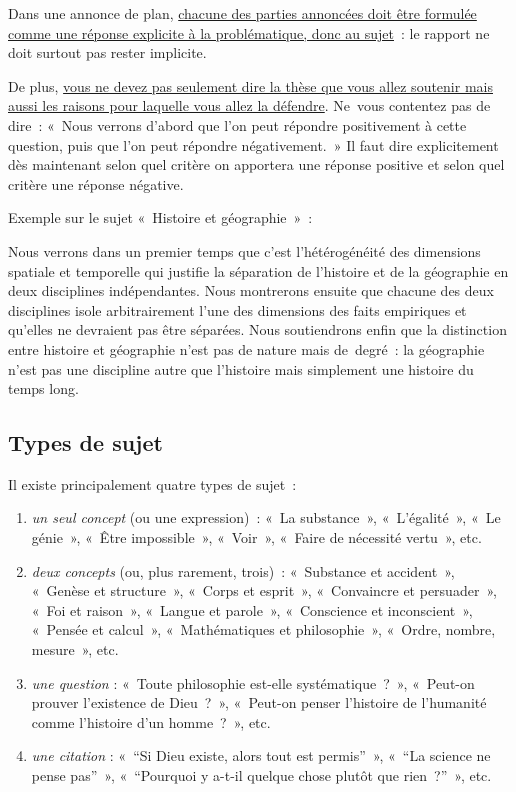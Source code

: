 \documentclass[a4paper,12pt]{article}
\begin{document}
Dans une annonce de plan, \uline{chacune des parties annoncées doit être
formulée comme une réponse explicite à la problématique, donc au
sujet} : le rapport ne doit surtout pas rester implicite. 

De plus, \uline{vous ne devez pas seulement dire la thèse que vous allez
soutenir mais aussi les raisons pour laquelle vous allez la défendre}.
Ne vous contentez pas de dire : « Nous verrons d'abord que l'on peut
répondre positivement à cette question, puis que l'on peut répondre
négativement. » Il faut dire explicitement dès maintenant selon quel
critère on apportera une réponse positive et selon quel critère une
réponse négative. 

Exemple sur le sujet « Histoire et géographie » : 
\begin{QUOTATION}
Nous verrons dans un premier temps que c'est l'hétérogénéité des
dimensions spatiale et temporelle qui justifie la séparation de
l'histoire et de la géographie en deux disciplines indépendantes. Nous
montrerons ensuite que chacune des deux disciplines isole arbitrairement
l'une des dimensions des faits empiriques et qu'elles ne devraient pas
être séparées. Nous soutiendrons enfin que la distinction entre histoire
et géographie n'est pas de nature mais de degré : la géographie n'est
pas une discipline autre que l'histoire mais simplement une histoire du
temps long.
\end{QUOTATION}


\subsection{Types de sujet}
\label{sec:org5b9fe86}
\label{org17e453c}

Il existe principalement quatre types de sujet :

\begin{enumerate}
\item \emph{un seul concept} (ou une expression) : « La substance », « L'égalité »,
« Le génie », « Être impossible », « Voir », « Faire de nécessité vertu »,
etc.

\item \emph{deux concepts} (ou, plus rarement, trois) : « Substance et
accident », « Genèse et structure », « Corps et esprit »,
« Convaincre et persuader », « Foi et raison », « Langue et parole »,
« Conscience et inconscient », « Pensée et calcul », « Mathématiques
et philosophie », « Ordre, nombre, mesure », etc.

\item \emph{une question} : « Toute philosophie est-elle systématique ? »,
« Peut-on prouver l'existence de Dieu ? », « Peut-on penser l'histoire
de l'humanité comme l'histoire d'un homme ? », etc.

\item \emph{une citation} : « ``Si Dieu existe, alors tout est permis'' »,
« ``La science ne pense pas'' », « ``Pourquoi y a-t-il quelque chose
plutôt que rien ?'' », etc.
\end{enumerate}
\end{document}
